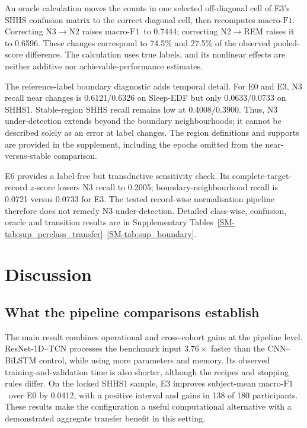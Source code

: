 \documentclass[11pt,a4paper]{article}
\newcommand{\mf}{\ensuremath{\mathrm{macro\text{-}F1}}}
\begin{document}
An oracle calculation moves the counts in one selected off-diagonal cell of E3's SHHS confusion
matrix to the correct diagonal cell, then recomputes \mf. Correcting N3$\rightarrow$N2 raises \mf\
to 0.7444; correcting N2$\rightarrow$REM raises it to 0.6596. These changes correspond to 74.5\% and
27.5\% of the observed pooled-score difference. The calculation uses true labels, and its nonlinear
effects are neither additive nor achievable-performance estimates.

The reference-label boundary diagnostic adds temporal detail. For E0 and E3, N3 recall near changes
is 0.6121/0.6326 on Sleep-EDF but only 0.0633/0.0733 on SHHS1. Stable-region SHHS recall remains low
at 0.4008/0.3900. Thus, N3 under-detection extends beyond the boundary neighbourhoods; it cannot be
described solely as an error at label changes. The region definitions and supports are provided in
the supplement, including the epochs omitted from the near-versus-stable comparison.

E6 provides a label-free but transductive sensitivity check. Its complete-target-record $z$-score lowers
N3 recall to 0.2005; boundary-neighbourhood recall is 0.0721 versus 0.0733 for E3.
The tested record-wise normalisation pipeline therefore does not remedy N3 under-detection. Detailed
class-wise, confusion, oracle and transition results are in Supplementary
Tables~\ref{SM-tab:sup_perclass_transfer}--\ref{SM-tab:sup_boundary}.


\section{Discussion}

\subsection{What the pipeline comparisons establish}

The main result combines operational and cross-cohort gains at the pipeline level. ResNet-1D--TCN
processes the benchmark input $3.76\times$ faster than the CNN--BiLSTM control,
while using more parameters and memory. Its observed training-and-validation time is also shorter,
although the recipes and stopping rules differ. On the locked SHHS1 sample, E3 improves subject-mean
\mf\ over E0 by 0.0412, with a positive interval and gains in 138 of 180 participants. These results
make the configuration a useful computational alternative with a demonstrated aggregate transfer
benefit in this setting.
\end{document}
